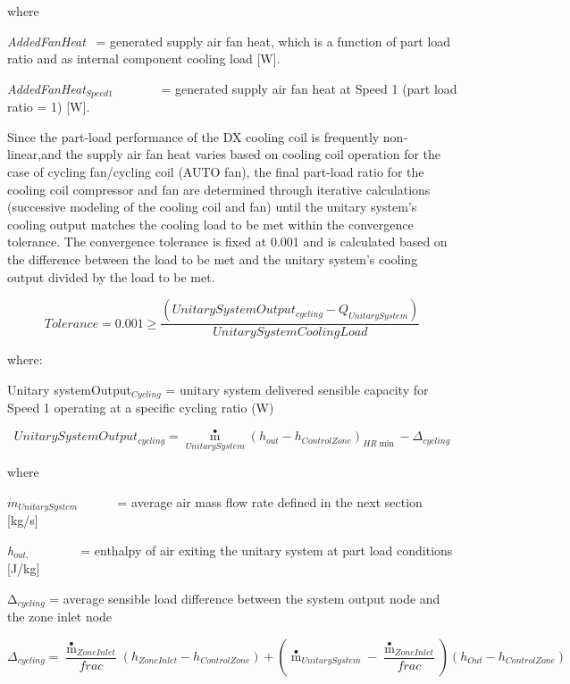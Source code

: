 where

\emph{AddedFanHeat}~ = generated supply air fan heat, which is a function of part load ratio and as internal component cooling load {[}W{]}.

\emph{AddedFanHeat\(_{Speed1}\)}~~~~~~~ = generated supply air fan heat at Speed 1 (part load ratio = 1) {[}W{]}.

Since the part-load performance of the DX cooling coil is frequently non-linear,and the supply air fan heat varies based on cooling coil operation for the case of cycling fan/cycling coil (AUTO fan), the final part-load ratio for the cooling coil compressor and fan are determined through iterative calculations (successive modeling of the cooling coil and fan) until the unitary system's cooling output matches the cooling load to be met within the convergence tolerance. The convergence tolerance is fixed at 0.001 and is calculated based on the difference between the load to be met and the unitary system's cooling output divided by the load to be met.

\begin{equation}
Tolerance = 0.001 \ge \frac{{\left( {UnitarySystemOutpu{t_{cycling}} - {Q_{UnitarySystem}}} \right)}}{{UnitarySystemCoolingLoad}}
\end{equation}

where:

Unitary systemOutput\(_{Cycling}\) = unitary system delivered sensible capacity for Speed 1 operating at a specific cycling ratio (W)

\begin{equation}
UnitarySystemOutpu{t_{cycling}} = {\mathop m\limits^ \bullet_{UnitarySystem}}{\left( {{h_{out}} - {h_{ControlZone}}} \right)_{HR\min }} - {\Delta_{cycling}}
\end{equation}

where

\({\dot m{_{UnitarySystem}}}\) ~~~~~ = average air mass flow rate defined in the next section {[}kg/s{]}

\emph{h\(_{out,}\)} ~~~~~ ~ = enthalpy of air exiting the unitary system at part load conditions {[}J/kg{]}

Δ\(_{cycling}\) = average sensible load difference between the system output node and the zone inlet node

\begin{equation}
{\Delta_{cycling}} = \frac{{{{\mathop m\limits^ \bullet  }_{ZoneInlet}}}}{{frac}}\left( {{h_{ZoneInlet}} - {h_{ControlZone}}} \right) + \left( {{{\mathop m\limits^ \bullet  }_{UnitarySystem}} - \frac{{{{\mathop m\limits^ \bullet  }_{ZoneInlet}}}}{{frac}}} \right)\left( {{h_{Out}} - {h_{ControlZone}}} \right)
\end{equation}

